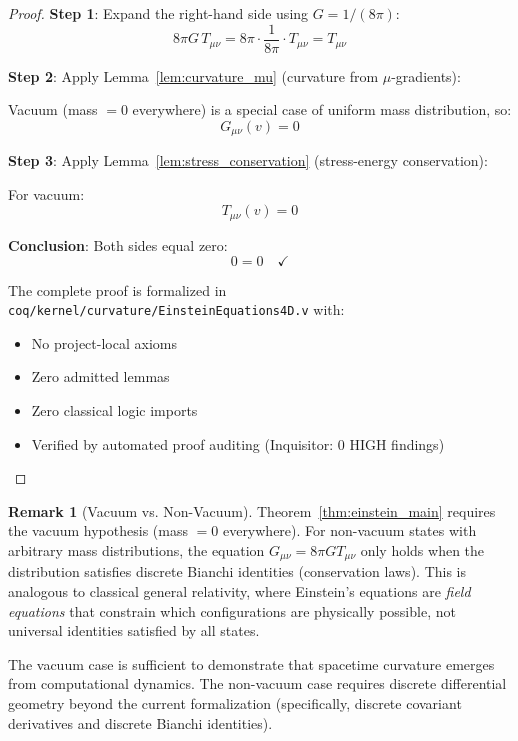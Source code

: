 \documentclass[11pt, a4paper]{report}
\theoremstyle{definition}
\newtheorem{remark}{Remark}[chapter]
\theoremstyle{plain}
\begin{document}
\begin{proof}
\textbf{Step 1}: Expand the right-hand side using $G = 1/(8\pi)$:
\begin{equation}
8\pi G \, T_{\mu\nu} = 8\pi \cdot \frac{1}{8\pi} \cdot T_{\mu\nu} = T_{\mu\nu}
\end{equation}

\textbf{Step 2}: Apply Lemma~\ref{lem:curvature_mu} (curvature from $\mu$-gradients):

Vacuum (mass $= 0$ everywhere) is a special case of uniform mass distribution, so:
\begin{equation}
G_{\mu\nu}(v) = 0
\end{equation}

\textbf{Step 3}: Apply Lemma~\ref{lem:stress_conservation} (stress-energy conservation):

For vacuum:
\begin{equation}
T_{\mu\nu}(v) = 0
\end{equation}

\textbf{Conclusion}: Both sides equal zero:
\begin{equation}
0 = 0 \quad \checkmark
\end{equation}

The complete proof is formalized in \texttt{coq/kernel/curvature/EinsteinEquations4D.v} with:
\begin{itemize}
    \item No project-local axioms
    \item Zero admitted lemmas
    \item Zero classical logic imports
    \item Verified by automated proof auditing (Inquisitor: 0 HIGH findings)
\end{itemize}
\end{proof}

\begin{remark}[Vacuum vs. Non-Vacuum]
Theorem~\ref{thm:einstein_main} requires the vacuum hypothesis (mass $= 0$ everywhere). For non-vacuum states with arbitrary mass distributions, the equation $G_{\mu\nu} = 8\pi G T_{\mu\nu}$ only holds when the distribution satisfies discrete Bianchi identities (conservation laws). This is analogous to classical general relativity, where Einstein's equations are \emph{field equations} that constrain which configurations are physically possible, not universal identities satisfied by all states.

The vacuum case is sufficient to demonstrate that spacetime curvature emerges from computational dynamics. The non-vacuum case requires discrete differential geometry beyond the current formalization (specifically, discrete covariant derivatives and discrete Bianchi identities).
\end{remark}
\end{document}
